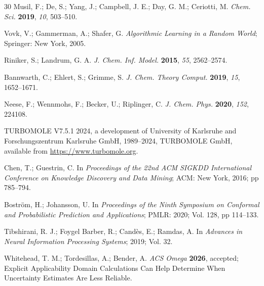 \documentclass[journal=jcisd8,manuscript=article]{achemso}
\begin{document}
\begin{thebibliography}{30}
Musil, F.; De, S.; Yang, J.; Campbell, J. E.; Day, G. M.; Ceriotti, M. \textit{Chem. Sci.} \textbf{2019}, \textit{10}, 503--510.

Vovk, V.; Gammerman, A.; Shafer, G. \textit{Algorithmic Learning in a Random World}; Springer: New York, 2005.

Riniker, S.; Landrum, G. A. \textit{J. Chem. Inf. Model.} \textbf{2015}, \textit{55}, 2562--2574.

Bannwarth, C.; Ehlert, S.; Grimme, S. \textit{J. Chem. Theory Comput.} \textbf{2019}, \textit{15}, 1652--1671.

Neese, F.; Wennmohs, F.; Becker, U.; Riplinger, C. \textit{J. Chem. Phys.} \textbf{2020}, \textit{152}, 224108.

TURBOMOLE V7.5.1 2024, a development of University of Karlsruhe and Forschungszentrum Karlsruhe GmbH, 1989--2024, TURBOMOLE GmbH, available from \url{https://www.turbomole.org}.

Chen, T.; Guestrin, C. In \textit{Proceedings of the 22nd ACM SIGKDD International Conference on Knowledge Discovery and Data Mining}; ACM: New York, 2016; pp 785--794.

Bostr\"{o}m, H.; Johansson, U. In \textit{Proceedings of the Ninth Symposium on Conformal and Probabilistic Prediction and Applications}; PMLR: 2020; Vol. 128, pp 114--133.

Tibshirani, R. J.; Foygel Barber, R.; Cand\`{e}s, E.; Ramdas, A. In \textit{Advances in Neural Information Processing Systems}; 2019; Vol. 32.

Whitehead, T. M.; Tordesillas, A.; Bender, A. \textit{ACS Omega} \textbf{2026}, accepted; Explicit Applicability Domain Calculations Can Help Determine When Uncertainty Estimates Are Less Reliable.

\end{thebibliography}
\end{document}
